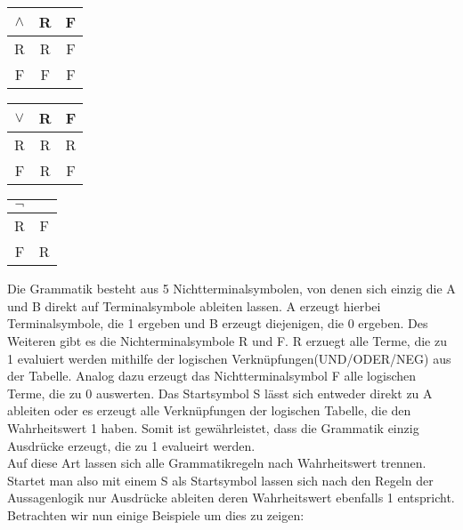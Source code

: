 \documentclass[11pt]{article}
\begin{document}
\\ \ \\
\begin{tabular}[h]{c|cc}
$\wedge$ & R & F \\
\hline
R & R & F\\
F & F & F\\
\end{tabular}
\quad
\begin{tabular}[h]{c|cc}
$\vee$ & R & F \\
\hline
R & R & R\\
F & R & F\\
\end{tabular}
\quad
\begin{tabular}[h]{c|c}
$\neg$ \\
\hline
R & F\\
F & R\\
\end{tabular}

Die Grammatik besteht aus 5 Nichtterminalsymbolen, von denen sich einzig die A und B direkt auf Terminalsymbole ableiten lassen. A erzeugt hierbei Terminalsymbole, die 1 ergeben und B erzeugt diejenigen, die 0 ergeben. Des Weiteren gibt es die Nichterminalsymbole R und F. R erzuegt alle Terme, die zu 1 evaluiert werden mithilfe der logischen Verknüpfungen(UND/ODER/NEG) aus der Tabelle. Analog dazu erzeugt das Nichtterminalsymbol F alle logischen Terme, die zu 0 auswerten. Das Startsymbol S lässt sich entweder direkt zu A ableiten oder es erzeugt alle Verknüpfungen der logischen Tabelle, die den Wahrheitswert 1 haben. Somit ist gewährleistet, dass die Grammatik einzig Ausdrücke erzeugt, die zu 1 evalueirt werden.   
\\Auf diese Art lassen sich alle Grammatikregeln nach Wahrheitswert trennen. Startet man also mit einem S als Startsymbol lassen sich nach den Regeln der Aussagenlogik nur Ausdrücke ableiten deren Wahrheitswert ebenfalls 1 entspricht.
\\Betrachten wir nun einige Beispiele um dies zu zeigen:
\end{document}

